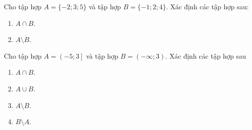 

\begin{bt}%
Cho tập hợp $A=\{-2 ; 3 ; 5\}$ và tập hợp $B=\{-1 ; 2 ; 4\}$. Xác định các tập hợp sau:
\begin{enumerate}
\item  $A \cap B$.
\item $A\setminus B$.
\end{enumerate}
\end{bt}

\begin{bt}%
Cho tập hợp $A=\left(-5;3\right]$ và tập hợp $B=\left(-\infty;3\right)$. Xác định các tập hợp sau
\begin{enumerate}
\item $A\cap B$.
\item $A\cup B$.
\item $A\setminus B$.
\item $B\setminus A$.
\end{enumerate}
\loigiai{
\begin{enumerate}
\item $A\cap B=\left( -5;3\right)$.
\item $A\cup B=\left(-\infty;3\right]$.
\item $A\setminus B=\{3\}$.
\item $B\setminus A=\left(-\infty;-5\right]$.
\end{enumerate}
}
\end{bt}

